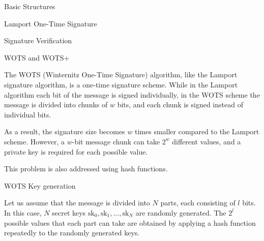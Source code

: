 \begin{section}{Basic Structures}
\begin{subsection}{Lamport One-Time Signature}
\begin{subsubsection}{Signature Verification}
	 \end{subsubsection}

 \end{subsection}

 \begin{subsection}{WOTS and WOTS+}

	 The WOTS (Winternitz One-Time Signature) algorithm, like the Lamport signature algorithm, is a one-time signature scheme. While in the Lamport algorithm each bit of the message is signed individually, in the WOTS scheme the message is divided into chunks of \( w \) bits, and each chunk is signed instead of individual bits.

	 As a result, the signature size becomes \( w \) times smaller compared to the Lamport scheme. However, a \( w \)-bit message chunk can take \( 2^w \) different values, and a private key is required for each possible value.

	 This problem is also addressed using hash functions.

	 \begin{subsubsection}{WOTS Key generation}

		 Let us assume that the message is divided into \( N \) parts, each consisting of \( l \) bits. In this case, \( N \) secret keys \( \text{sk}_0, \text{sk}_1, \ldots, \text{sk}_N \) are randomly generated. The \( 2^l \) possible values that each part can take are obtained by applying a hash function repeatedly to the randomly generated keys.

		 \begin{figure}
			 \centering
\end{figure}
\end{subsubsection}
\end{subsection}
\end{section}
